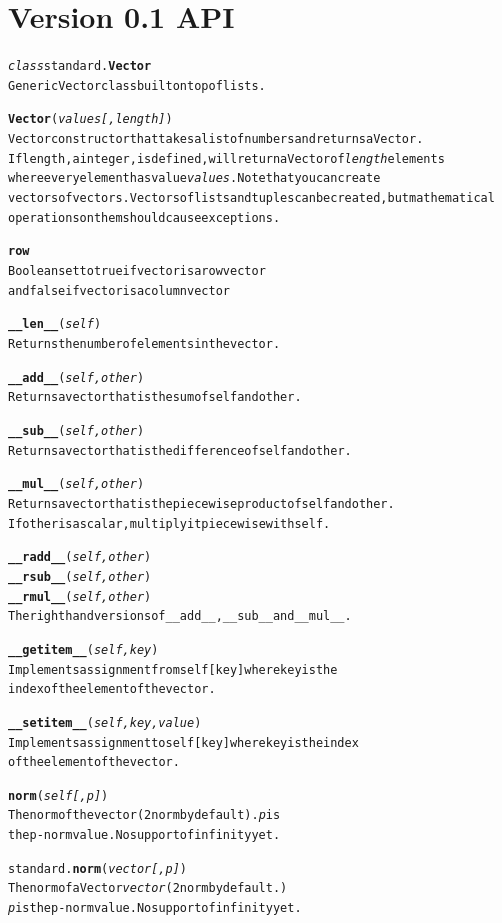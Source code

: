 \documentclass{book}
\begin{document}
\section{Version 0.1 API}
\begin{alltt}
\emph{class} standard.\textbf{Vector }
    Generic Vector class built on top of lists.

    \textbf{Vector}( \emph{ values [,length] } )
       Vector constructor that takes a list of numbers and returns a Vector.
       If length, a integer, is defined, will return a Vector of \emph{length} elements
       where every element has value \emph{values}. Note that you can create
       vectors of vectors. Vectors of lists and tuples can be created, but mathematical
       operations on them should cause exceptions.

    \textbf{row}
        Boolean set to true if vector is a row vector 
        and false if vector is a column vector

   \textbf{__len__}(\emph{self})
        Returns the number of elements in the vector.

    \textbf{__add__}( \emph{ self, other} )
         Returns a vector that is the sum of self and other.

    \textbf{__sub__}( \emph{ self, other} )
         Returns a vector that is the difference of self and other.

    \textbf{__mul__}( \emph{ self, other} )
         Returns a vector that is the piecewise product of self and other.
         If other is a scalar, multiply it piecewise with self.

    \textbf{__radd__}( \emph{ self, other} )
    \textbf{__rsub__}( \emph{ self, other} )
    \textbf{__rmul__}( \emph{ self, other} )
        The right hand versions of __add__, __sub__ and __mul__.

    \textbf{__getitem__}( \emph{ self, key} )
        Implements assignment from self[key] where key is the 
        index of the element of the vector.

    \textbf{__setitem__}( \emph{ self, key, value} )
        Implements assignment to self[key] where key is the index 
        of the element of the vector.

    \textbf{norm}(\emph{self[,p]})
        The norm of the vector (2 norm by default). \emph{p} is
         the p-norm value. No support of infinity yet.

standard.\textbf{norm}(\emph{ vector[,p]})
    The norm of a Vector \emph{vector} (2 norm by default.)
    \emph{p} is the p-norm value. No support of infinity yet.


\end{alltt}
\end{document}
